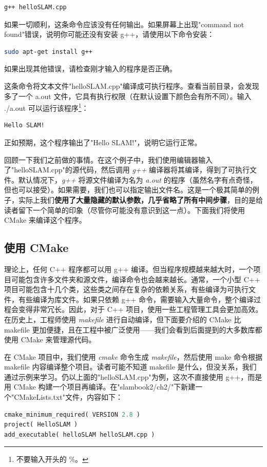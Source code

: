 \begin{lstlisting}[language=sh,caption=终端输入：]
g++ helloSLAM.cpp
\end{lstlisting}

如果一切顺利，这条命令应该没有任何输出。如果屏幕上出现"command not found"错误，说明你可能还没有安装 g++，请使用以下命令安装：
\begin{lstlisting}[language=sh,caption=终端输入：]
sudo apt-get install g++
\end{lstlisting}
如果出现其他错误，请检查刚才输入的程序是否正确。

这条命令将文本文件"helloSLAM.cpp"编译成可执行程序。查看当前目录，会发现多了一个 a.out 文件，它具有执行权限（在默认设置下颜色会有所不同）。输入 ./a.out 可以运行该程序\footnote{不要输入开头的 \%。}：

\begin{lstlisting}[language=sh,caption=终端输入：]
% ./a.out
Hello SLAM!
\end{lstlisting}

正如预期，这个程序输出了"Hello SLAM!"，说明它运行正常。

回顾一下我们之前做的事情。在这个例子中，我们使用编辑器输入了"helloSLAM.cpp"的源代码，然后调用 \textit{g++} 编译器将其编译，得到了可执行文件。默认情况下，\textit{g++} 将源文件编译为名为 \textit{a.out} 的程序（虽然名字有点奇怪，但也可以接受）。如果需要，我们也可以指定输出文件名。这是一个极其简单的例子，实际上我们\textbf{使用了大量隐藏的默认参数，几乎省略了所有中间步骤}，目的是给读者留下一个简单的印象（尽管你可能没有意识到这一点）。下面我们将使用 CMake 来编译这个程序。

\subsection{使用 CMake}
理论上，任何 C++ 程序都可以用 g++ 编译。但当程序规模越来越大时，一个项目可能包含许多文件夹和源文件，编译命令也会越来越长。通常，一个小型 C++ 项目可能包含十几个类，这些类之间存在复杂的依赖关系，有些编译为可执行文件，有些编译为库文件。如果只依赖 g++ 命令，需要输入大量命令，整个编译过程会变得非常冗长。因此，对于 C++ 项目，使用一些工程管理工具会更加高效。在历史上，工程师使用 \textit{makefile} 进行自动编译，但下面要介绍的 CMake 比 makefile 更加便捷，且在工程中被广泛使用——我们会看到后面提到的大多数库都使用 CMake 来管理源代码。

在 CMake 项目中，我们使用 \textit{cmake} 命令生成 \textit{makefile}，然后使用 make 命令根据 makefile 内容编译整个项目。读者可能不知道 makefile 是什么，但没关系，我们通过示例来学习。仍以上面的"helloSLAM.cpp"为例，这次不直接使用 g++，而是用 CMake 构建一个项目再编译。在"slambook2/ch2/"下新建一个"CMakeLists.txt"文件，内容如下：
\begin{lstlisting}[language=Python,caption=slambook2/ch2/CMakeLists.txt]
cmake_minimum_required( VERSION 2.8 )
project( HelloSLAM )
add_executable( helloSLAM helloSLAM.cpp )
\end{lstlisting}


